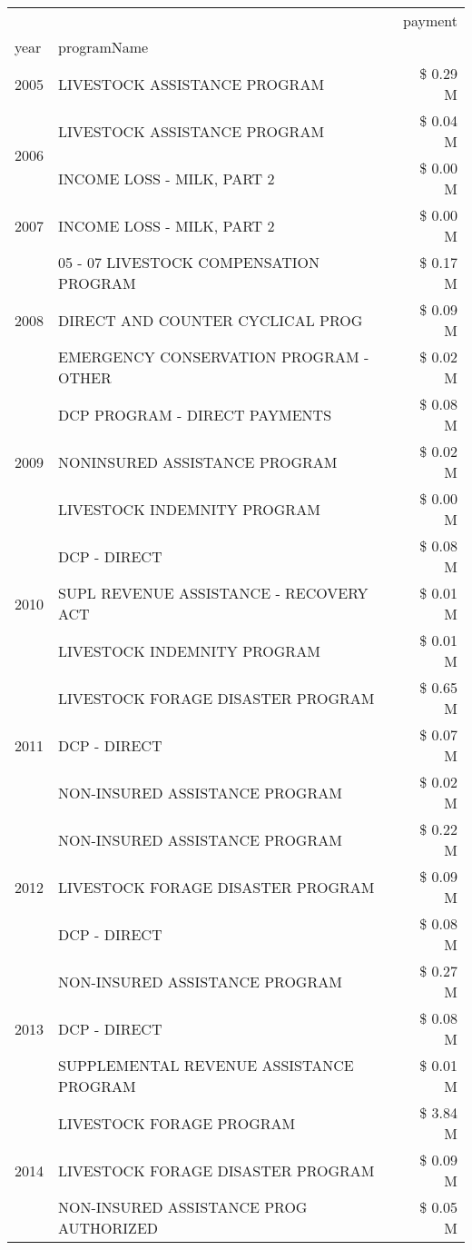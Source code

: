 \begin{tabular}{llr}
\toprule
 &  & payment \\
year & programName &  \\
\midrule
2005 & LIVESTOCK ASSISTANCE PROGRAM & \$ 0.29 M \\
\cline{1-3}
\multirow[t]{2}{*}{2006} & LIVESTOCK ASSISTANCE PROGRAM & \$ 0.04 M \\
 & INCOME LOSS - MILK, PART 2 & \$ 0.00 M \\
\cline{1-3}
2007 & INCOME LOSS - MILK, PART 2 & \$ 0.00 M \\
\cline{1-3}
\multirow[t]{3}{*}{2008} & 05 - 07 LIVESTOCK COMPENSATION PROGRAM & \$ 0.17 M \\
 & DIRECT AND COUNTER CYCLICAL PROG & \$ 0.09 M \\
 & EMERGENCY CONSERVATION PROGRAM - OTHER & \$ 0.02 M \\
\cline{1-3}
\multirow[t]{3}{*}{2009} & DCP PROGRAM - DIRECT PAYMENTS & \$ 0.08 M \\
 & NONINSURED ASSISTANCE PROGRAM & \$ 0.02 M \\
 & LIVESTOCK INDEMNITY PROGRAM & \$ 0.00 M \\
\cline{1-3}
\multirow[t]{3}{*}{2010} & DCP - DIRECT & \$ 0.08 M \\
 & SUPL REVENUE ASSISTANCE - RECOVERY ACT & \$ 0.01 M \\
 & LIVESTOCK INDEMNITY PROGRAM & \$ 0.01 M \\
\cline{1-3}
\multirow[t]{3}{*}{2011} & LIVESTOCK FORAGE DISASTER PROGRAM & \$ 0.65 M \\
 & DCP - DIRECT & \$ 0.07 M \\
 & NON-INSURED ASSISTANCE PROGRAM & \$ 0.02 M \\
\cline{1-3}
\multirow[t]{3}{*}{2012} & NON-INSURED ASSISTANCE PROGRAM & \$ 0.22 M \\
 & LIVESTOCK FORAGE DISASTER PROGRAM & \$ 0.09 M \\
 & DCP - DIRECT & \$ 0.08 M \\
\cline{1-3}
\multirow[t]{3}{*}{2013} & NON-INSURED ASSISTANCE PROGRAM & \$ 0.27 M \\
 & DCP - DIRECT & \$ 0.08 M \\
 & SUPPLEMENTAL REVENUE ASSISTANCE PROGRAM & \$ 0.01 M \\
\cline{1-3}
\multirow[t]{3}{*}{2014} & LIVESTOCK FORAGE PROGRAM & \$ 3.84 M \\
 & LIVESTOCK FORAGE DISASTER PROGRAM & \$ 0.09 M \\
 & NON-INSURED ASSISTANCE PROG AUTHORIZED & \$ 0.05 M \\

\end{tabular}
